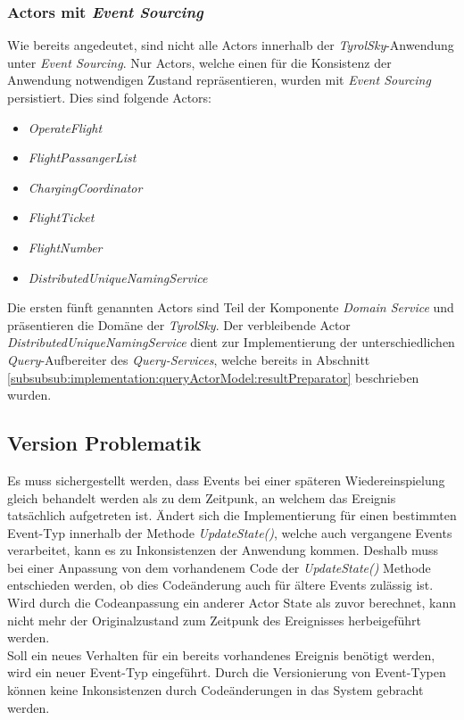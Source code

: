 \subsubsection{Actors mit \textit{Event Sourcing}}
Wie bereits angedeutet, sind nicht alle Actors innerhalb der \textit{TyrolSky}-Anwendung unter \textit{Event Sourcing}. Nur Actors, welche einen für die Konsistenz der Anwendung notwendigen Zustand repräsentieren, wurden mit \textit{Event Sourcing} persistiert. Dies sind folgende Actors: 
% 
% 
\begin{itemize}
    \item{\textit{OperateFlight}}
    \item{\textit{FlightPassangerList}}
    \item{\textit{ChargingCoordinator}}
    \item{\textit{FlightTicket}}
    \item{\textit{FlightNumber}}
    \item{\textit{DistributedUniqueNamingService}}
\end{itemize}
Die ersten fünft genannten Actors sind Teil der Komponente \textit{Domain Service} und präsentieren die Domäne der \textit{TyrolSky}. Der verbleibende Actor \textit{DistributedUniqueNamingService} dient zur Implementierung der unterschiedlichen \textit{Query}-Aufbereiter des \textit{Query-Services}, welche bereits in Abschnitt \ref{subsubsub:implementation:queryActorModel:resultPreparator} beschrieben wurden.

\subsection{Version Problematik}
Es muss sichergestellt werden, dass Events bei einer späteren Wiedereinspielung gleich behandelt werden als zu dem Zeitpunk, an welchem das Ereignis tatsächlich aufgetreten ist. Ändert sich die Implementierung für einen bestimmten Event-Typ innerhalb der Methode \textit{UpdateState()}, welche auch vergangene Events verarbeitet, kann es zu Inkonsistenzen der Anwendung kommen. Deshalb muss bei einer Anpassung von dem vorhandenem Code der \textit{UpdateState()} Methode entschieden werden, ob dies Codeänderung auch für ältere Events zulässig ist. Wird durch die Codeanpassung ein anderer Actor State als zuvor berechnet, kann nicht mehr der Originalzustand zum Zeitpunk des Ereignisses herbeigeführt werden. \\
Soll ein neues Verhalten für ein bereits vorhandenes Ereignis benötigt werden, wird ein neuer Event-Typ eingeführt. Durch die Versionierung von Event-Typen können keine Inkonsistenzen durch Codeänderungen in das System gebracht werden. 
% 
% 

